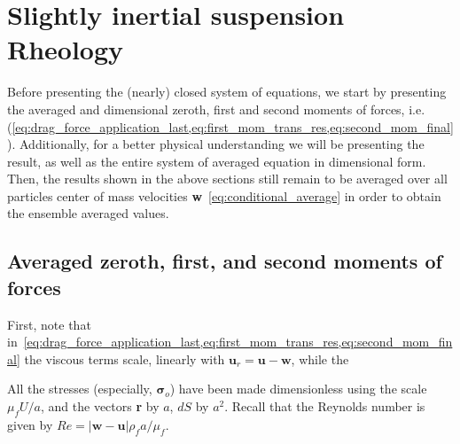 
\section{Slightly inertial suspension Rheology}

Before presenting the (nearly) closed system of equations, we start by presenting the averaged and dimensional zeroth, first and second moments of forces, i.e. (\ref{eq:drag_force_application_last,eq:first_mom_trans_res,eq:second_mom_final}). 
Additionally, for a better physical understanding we will be presenting the result, as well as the entire system of averaged equation in dimensional form. 
Then, the results shown in the above sections still remain to be averaged over all particles center of mass velocities \textbf{w}~\eqref{eq:conditional_average} in order to obtain the ensemble averaged values.



\subsection{Averaged zeroth, first, and second moments of forces}

First, note that in~\ref{eq:drag_force_application_last,eq:first_mom_trans_res,eq:second_mom_final} the viscous terms scale, linearly with $\textbf{u}_r= \textbf{u} - \textbf{w}$, while the 


All the stresses (especially, $\bm\sigma_o$) have been made dimensionless using the scale $\mu_f U/a$, and the vectors \textbf{r} by $a$, $dS$ by $a^2$.
Recall that the Reynolds number is given by $Re= |\textbf{w} - \textbf{u}|\rho_f a/\mu_f$. 

